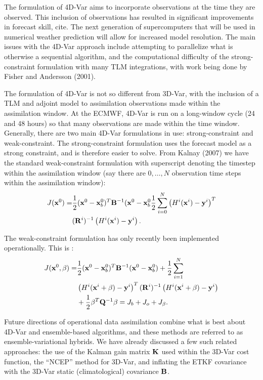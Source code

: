 \documentclass[12pt]{report}
\begin{document}
The formulation of 4D-Var aims to incorporate observations at the time they are observed.
This inclusion of observations has resulted in significant improvements in forecast skill, cite.
The next generation of supercomputers that will be used in numerical weather prediction will allow for increased model resolution.
The main issues with the 4D-Var approach include attempting to parallelize what is otherwise a sequential algorithm, and the computational difficulty of the strong-constraint formulation with many TLM integrations, with work being done by Fisher and Andersson (2001). 

The formulation of 4D-Var is not so different from 3D-Var, with the inclusion of a TLM and adjoint model to assimilation observations made within the assimilation window.
At the ECMWF, 4D-Var is run on a long-window cycle (24 and 48 hours) so that many observations are made within the time window.
Generally, there are two main 4D-Var formulations in use: strong-constraint and weak-constraint.
The strong-constraint formulation uses the forecast model as a strong constraint, and is therefore easier to solve.
From Kalnay (2007) we have the standard weak-constraint formulation with superscript denoting the timestep within the assimilation window (say there are $0,\ldots,N$ observation time steps within the assimilation window):
\begin{align*} J(\mathbf{x}^0) = &\frac{1}{2} (\mathbf{x}^0 - \mathbf{x}^0_b) ^T \mathbf{B} ^{-1} (\mathbf{x}^0 - \mathbf{x}_b^0 \frac{1}{2} \sum _{i=0}^N \left( H^i(\mathbf{x}^i)-\mathbf{y}^i\right)^T\\
&(\mathbf{R}^i) ^{-1} \left( H^i(\mathbf{x}^i)-\mathbf{y}^i \right ) .\end{align*}

The weak-constraint formulation has only recently been implemented operationally.
This is :
\begin{align*} J(\mathbf{x}^0 , \beta) = &\frac{1}{2} (\mathbf{x}^0 - \mathbf{x}^0_b)^T \mathbf{B}^{-1} (\mathbf{x}^0 - \mathbf{x}^0_b) + \frac{1}{2} \sum _{i=1} ^N\\
& \left(H^i(\mathbf{x}^i+\beta)-\mathbf{y}^i\right)^T (\mathbf{R}^i)^{-1} \left(H^i(\mathbf{x}^i+\beta)-\mathbf{y}^i\right) \\
&+\frac{1}{2}\beta^T\mathbf{Q}^{-1}\beta = J_b +J_o+J_\beta.\end{align*}

Future directions of operational data assimilation combine what is best about 4D-Var and ensemble-based algorithms, and these methods are referred to as ensemble-variational hybrids.
We have already discussed a few such related approaches: the use of the Kalman gain matrix $\mathbf{K}$ used within the 3D-Var cost function, the ``NCEP'' method for 3D-Var, and inflating the ETKF covariance with the 3D-Var static (climatological) covariance $\mathbf{B}$.
\end{document}
